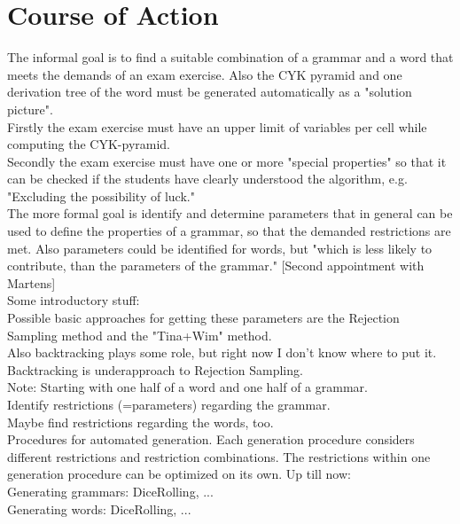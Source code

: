 
\section{Course of Action}\label{CourseOfAction}

The informal goal is to find a suitable combination of a grammar and a word that meets the demands of an exam exercise. Also the CYK pyramid and one derivation tree of the word must be generated automatically as a "solution picture".\\
Firstly the exam exercise must have an upper limit of variables per cell while computing the CYK-pyramid.\\
Secondly the exam exercise must have one or more "special properties" so that it can be checked if the students have clearly understood the algorithm, e.g. "Excluding the possibility of luck."\\

\noindent The more formal goal is identify and determine parameters that in general can be used to define the properties of a grammar, so that the demanded restrictions are met. Also parameters could be identified for words, but "which is less likely to contribute, than the parameters of the grammar." [Second appointment with Martens] \\

\noindent Some introductory stuff:\\


\noindent Possible basic approaches for getting these parameters are the Rejection Sampling method and the "Tina+Wim" method. \\
Also backtracking plays some role, but right now I don't know where to put it. Backtracking is underapproach to Rejection Sampling. \\
Note: Starting with one half of a word and one half of a grammar.\\ 

\noindent Identify restrictions (=parameters) regarding the grammar.\\
Maybe find restrictions regarding the words, too.\\

\noindent Procedures for automated generation. Each generation procedure considers different restrictions and restriction combinations. The restrictions within one generation procedure can be optimized on its own. Up till now: \\
Generating grammars: DiceRolling, ...\\
Generating words: DiceRolling, ...\\

